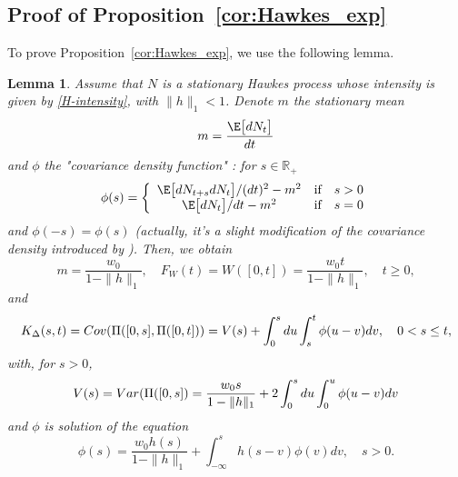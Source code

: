 \documentclass[aos]{imsart}
\theoremstyle{plain}
\newtheorem{lemma}[theorem]{Lemma}
\theoremstyle{remark}
\newcommand{\R}{\mathbb{R}}
\newcommand{\1}{1}
\begin{document}
\subsection{Proof of Proposition~\ref{cor:Hawkes_exp}}
To prove Proposition~\ref{cor:Hawkes_exp}, we use the following lemma.
\begin{lemma}\label{cov-Hawkes}
Assume that $N$ is a stationary Hawkes process whose intensity is given by \eqref{H-intensity}, with $\|h\|_1<1$. 
Denote $m$ the stationary mean  
\[
m=\frac{\E\big[dN_t\big]}{dt}
\] 
and
$\phi$ the "covariance density function" \cite{Hawkes71a}: for $s\in\R_+$
$$\phi(s)=\left\{\begin{array}{ccc}
\E\big[dN_{t+s}dN_t\big]/(dt)^2- m^2&\mbox{if}   &s>0   \\
\E\big[dN_t\big]/dt- m^2&\mbox{if}   &s=0  
 \end{array}
\right.$$
and $\phi(-s)=\phi(s)$ (actually, it's a slight modification of the covariance density introduced by \cite{Hawkes71a}).
Then, we obtain
\[
m=\frac{w_0}{1-\|h\|_1},\quad F_W(t)=W([0,t])=\frac{w_0 t}{1-\|h\|_1}, \quad t\geq 0,
\]
and
\[
K_\Delta(s,t)={\rm Cov}(\Pi([0,s],\Pi([0,t]))=V(s)+\int_0^sdu\int_s^t\phi(u-v)dv, \quad 0<s\leq t,
\]
with, for $s>0$,
\[
V(s)={\rm Var}(\Pi([0,s])=\frac{w_0 s}{1-\|h\|_1}+2\int_0^sdu\int_0^u\phi(u-v)dv
\]
and $\phi$ is solution of the equation
\[
\phi(s)=\frac{w_0 h(s)}{1-\|h\|_1}+\int_{-\infty}^sh(s-v)\phi(v)dv,\quad s>0.
\]
\end{lemma}
\end{document}
